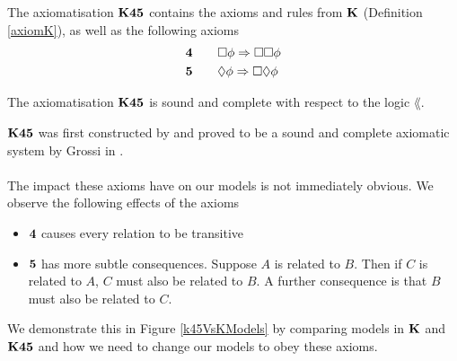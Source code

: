 \begin{lemma} \label{axiomK45}
The axiomatisation $\bf K45$ contains the axioms and rules from $\bf K$ (Definition
    \ref{axiomK}), as well as the following axioms
\begin{alignat*}{2}
  & \bf 4 && \quad \Box \phi \Rightarrow \Box \Box \phi \\
  & \bf 5 && \quad \Diamond \phi \Rightarrow \Box \Diamond \phi
\end{alignat*}
\end{lemma}

\begin{lemma} \label{axiomK45SoundComplete}
The axiomatisation $\bf K45$ is sound and complete with respect to the logic
$\lang$.
\end{lemma}

$\bf K45$ was first constructed by \FIXME and proved to be a sound and complete axiomatic
system by Grossi in \cite{grossi2007designing}.\\
\\
The impact these axioms have on our models is not immediately obvious.
We observe the following effects of the axioms
\begin{itemize}
	\item $\bf 4$ causes every relation to be transitive
	\item $\bf 5$ has more subtle consequences.
    Suppose $A$ is related to $B$.
    Then if $C$ is related to $A$, $C$ must also be related to $B$.
    A further consequence is that $B$ must also be related to $C$.
\end{itemize}

We demonstrate this in Figure \ref{k45VsKModels} by comparing models in $\bf K$ and $\bf K45$ and how we need to change
our models to obey these axioms.

